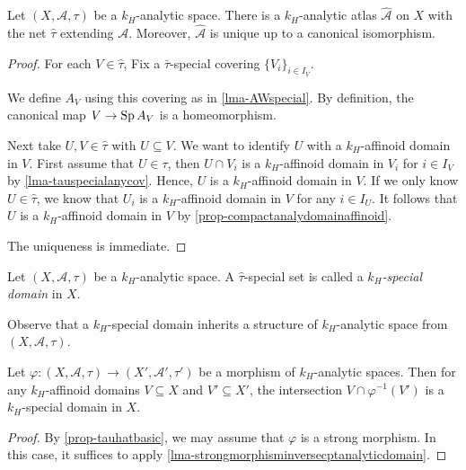 \begin{proposition}
    Let  $(X,\mathcal{A},\tau)$ be a $k_H$-analytic space. There is a $k_H$-analytic atlas $\hat{\mathcal{A}}$ on $X$ with the net $\hat{\tau}$ extending $\mathcal{A}$. Moreover, $\hat{\mathcal{A}}$ is unique up to a canonical isomorphism.
\end{proposition}
\begin{proof}
    For each $V\in \hat{\tau}$, Fix a $\bar{\tau}$-special covering $\{V_i\}_{i\in I_V}$.
    
    We define $A_V$ using this covering as in \cref{lma-AWspecial}. By definition, the canonical map $V\rightarrow \operatorname{Sp} A_V$ is a homeomorphism.

    Next take $U,V\in \hat{\tau}$ with $U\subseteq V$. We want to identify $U$ with a $k_H$-affinoid domain in $V$. First assume that $U\in \tau$, then $U\cap V_i$ is a $k_H$-affinoid domain in $V_i$ for $i\in I_V$ by \cref{lma-tauspecialanycov}. Hence, $U$ is a $k_H$-affinoid domain in $V$. If we only know $U\in \hat{\tau}$,  we know that $U_i$ is a $k_H$-affinoid domain in $V$ for any $i\in I_U$. It follows that $U$ is a $k_H$-affinoid domain in $V$ by \cref{prop-compactanalydomainaffinoid}.
    
    The uniqueness is immediate.
\end{proof}

\begin{definition}
    Let  $(X,\mathcal{A},\tau)$ be a $k_H$-analytic space. A $\hat{\tau}$-special set is called a \emph{$k_H$-special domain} in $X$.
\end{definition}
Observe that a $k_H$-special domain inherits a structure of $k_H$-analytic space from $(X,\mathcal{A},\tau)$.

\begin{proposition}
    Let $\varphi:(X,\mathcal{A},\tau)\rightarrow (X',\mathcal{A}',\tau')$ be a morphism of $k_H$-analytic spaces. Then for any $k_H$-affinoid domains $V\subseteq X$ and $V'\subseteq X'$, the intersection $V\cap \varphi^{-1}(V')$ is a $k_H$-special domain in $X$.
\end{proposition}
\begin{proof}
    By \cref{prop-tauhatbasic}, we may assume that $\varphi$ is a strong morphism. In this case, it suffices to apply \cref{lma-strongmorphisminversecptanalyticdomain}.
\end{proof}


